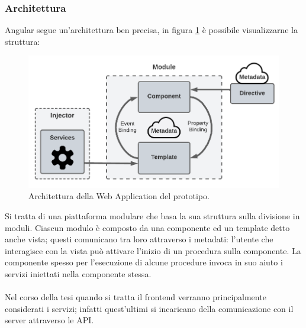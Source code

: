 \subsubsection*{Architettura}
Angular segue un'architettura ben precisa, in figura \ref{angular-architecture} è possibile visualizzarne la struttura:
\FloatBarrier
\begin{figure}[!ht]
\centering
\includegraphics[width=1\linewidth]{immagini/angularArchitecture.pdf}
\caption{Architettura della Web Application del prototipo.}
\label{angular-architecture}
\end{figure}
\FloatBarrier
Si tratta di una piattaforma modulare che basa la sua struttura sulla divisione in moduli. Ciascun modulo è composto da una componente ed un template detto anche vista; questi comunicano tra loro attraverso i metadati: l'utente che interagisce con la vista può attivare l'inizio di un procedura sulla componente. La componente spesso per l'esecuzione di alcune procedure invoca in suo aiuto i servizi iniettati nella componente stessa. \\\\
Nel corso della tesi quando si tratta il frontend verranno principalmente considerati i servizi; infatti quest'ultimi si incaricano della comunicazione con il server attraverso le API.
